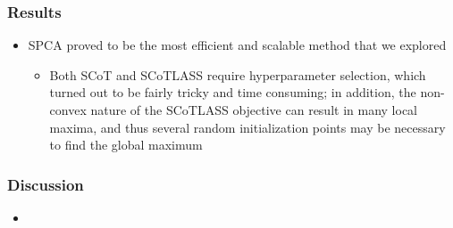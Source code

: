 \documentclass[11pt]{beamer}
\begin{document}
\begin{frame}\frametitle{Results}
\begin{itemize}
\item SPCA proved to be the most efficient and scalable method that we explored
\begin{itemize}
    \item Both SCoT and SCoTLASS require hyperparameter selection, which turned out to be fairly tricky and time consuming; in addition, the non-convex nature of the SCoTLASS objective can result in many local maxima, and thus several random initialization points may be necessary to find the global maximum
\end{itemize}
\end{itemize}
\end{frame}

\begin{frame}\frametitle{Discussion}
\begin{itemize}
\item 
\end{itemize}
\end{frame}
\end{document}
